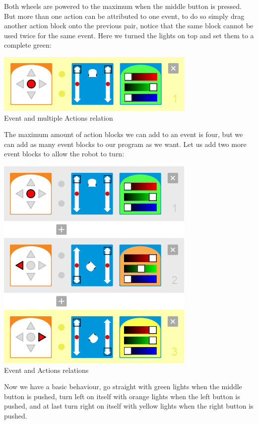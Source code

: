 \documentclass{scrbook}
\begin{document}
Both wheels are powered to the maximum when the middle button is pressed. But more than one action can be attributed to one event, 
to do so simply drag another action block onto the previous pair, notice that the same block cannot be used twice for the same event. 
Here we turned the lights on top and set them to a complete green:\\
\begin{center}
  \includegraphics[scale=0.5]{./VPL/middlebtn_forward_green}\\
  Event and multiple Actions relation
\end{center}

The maximum amount of action blocks we can add to an event is four, but we can add as many event blocks to our program as we want. 
Let us add two more event blocks to allow the robot to turn:\\
\begin{center}
  \includegraphics[scale=0.5]{./VPL/middlebtn_3E}\\
  Event and Actions relations
\end{center}

Now we have a basic behaviour, go straight with green lights when the middle button is pushed, turn left on itself with orange lights when the left button is pushed, 
and at last turn right on itself with yellow lights when the right button is pushed.\\
\end{document}
